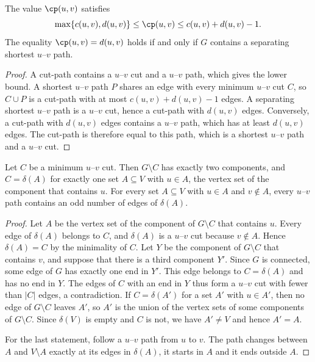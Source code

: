 \begin{lemma}
\label{lem:basic-bounds}
The value $\cp(u, v)$ satisfies
\[
\max\{c(u, v), d(u, v)\} \leq \cp(u, v) \leq c(u, v) + d(u, v) - 1.
\]
The equality $\cp(u, v) = d(u, v)$ holds if and only if $G$ contains a separating shortest $u$--$v$ path.
\end{lemma}

\begin{proof}
A cut-path contains a $u$--$v$ cut and a $u$--$v$ path, which gives the lower bound.
A shortest $u$--$v$ path $P$ shares an edge with every minimum $u$--$v$ cut $C$, so $C \cup P$ is a cut-path with at most $c(u, v) + d(u, v) - 1$ edges.
A separating shortest $u$--$v$ path is a $u$--$v$ cut, hence a cut-path with $d(u, v)$ edges.
Conversely, a cut-path with $d(u, v)$ edges contains a $u$--$v$ path, which has at least $d(u, v)$ edges.
The cut-path is therefore equal to this path, which is a shortest $u$--$v$ path and a $u$--$v$ cut.
\end{proof}

\begin{lemma}
\label{lem:minimum-cuts}
Let $C$ be a minimum $u$--$v$ cut.
Then $G \setminus C$ has exactly two components, and $C = \delta(A)$ for exactly one set $A \subseteq V$ with $u \in A$, the vertex set of the component that contains $u$.
For every set $A \subseteq V$ with $u \in A$ and $v \notin A$, every $u$--$v$ path contains an odd number of edges of $\delta(A)$.
\end{lemma}

\begin{proof}
Let $A$ be the vertex set of the component of $G \setminus C$ that contains $u$.
Every edge of $\delta(A)$ belongs to $C$, and $\delta(A)$ is a $u$--$v$ cut because $v \notin A$.
Hence $\delta(A) = C$ by the minimality of $C$.
Let $Y$ be the component of $G \setminus C$ that contains $v$, and suppose that there is a third component $Y'$.
Since $G$ is connected, some edge of $G$ has exactly one end in $Y'$.
This edge belongs to $C = \delta(A)$ and has no end in $Y$.
The edges of $C$ with an end in $Y$ thus form a $u$--$v$ cut with fewer than $|C|$ edges, a contradiction.
If $C = \delta(A')$ for a set $A'$ with $u \in A'$, then no edge of $G \setminus C$ leaves $A'$, so $A'$ is the union of the vertex sets of some components of $G \setminus C$.
Since $\delta(V)$ is empty and $C$ is not, we have $A' \neq V$ and hence $A' = A$.

For the last statement, follow a $u$--$v$ path from $u$ to $v$.
The path changes between $A$ and $V \setminus A$ exactly at its edges in $\delta(A)$, it starts in $A$ and it ends outside $A$.
\end{proof}

